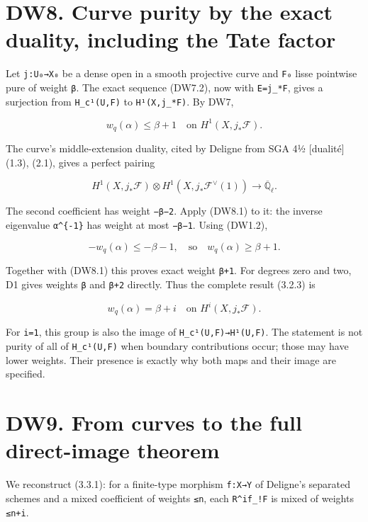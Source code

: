 \documentclass[
]{report}
\begin{document}
\section{DW8. Curve purity by the exact duality, including the Tate
factor}\label{dw8.-curve-purity-by-the-exact-duality-including-the-tate-factor}

Let \texttt{j:U₀→X₀} be a dense open in a smooth projective curve and
\texttt{F₀} lisse pointwise pure of weight \texttt{β}. The exact
sequence (DW7.2), now with \texttt{E=j\_*F}, gives a surjection from
\texttt{H\_c¹(U,F)} to \texttt{H¹(X,j\_*F)}. By DW7,

\[
w_q(\alpha)\le\beta+1
\quad\text{on }H^1(X,j_*\mathcal F).
\tag{DW8.1}
\]

The curve's middle-extension duality, cited by Deligne from SGA 4½
{[}dualité{]} (1.3), (2.1), gives a perfect pairing

\[
H^1(X,j_*\mathcal F)
\otimes
H^1(X,j_*\mathcal F^\vee(1))
\longrightarrow\overline{\mathbb Q}_\ell.
\tag{DW8.2}
\]

The second coefficient has weight \texttt{−β−2}. Apply (DW8.1) to it:
the inverse eigenvalue \texttt{α\^{}\{-1\}} has weight at most
\texttt{−β−1}. Using (DW1.2),

\[
-w_q(\alpha)\le-\beta-1,
\quad\text{so}\quad w_q(\alpha)\ge\beta+1.
\tag{DW8.3}
\]

Together with (DW8.1) this proves exact weight \texttt{β+1}. For degrees
zero and two, D1 gives weights \texttt{β} and \texttt{β+2} directly.
Thus the complete result (3.2.3) is

\[
\boxed{w_q(\alpha)=\beta+i
\quad\text{on }H^i(X,j_*\mathcal F).}
\tag{DW8.4}
\]

For \texttt{i=1}, this group is also the image of
\texttt{H\_c¹(U,F)→H¹(U,F)}. The statement is not purity of all of
\texttt{H\_c¹(U,F)} when boundary contributions occur; those may have
lower weights. Their presence is exactly why both maps and their image
are specified.

\section{DW9. From curves to the full direct-image
theorem}\label{dw9.-from-curves-to-the-full-direct-image-theorem}

We reconstruct (3.3.1): for a finite-type morphism \texttt{f:X→Y} of
Deligne's separated schemes and a mixed coefficient of weights
\texttt{≤n}, each \texttt{R\^{}if\_!F} is mixed of weights
\texttt{≤n+i}.
\end{document}

